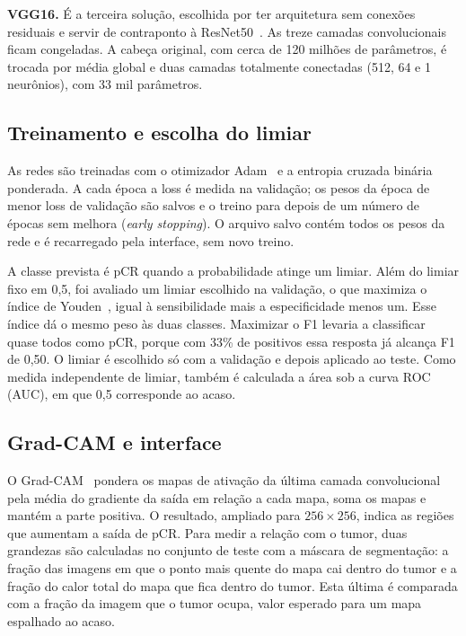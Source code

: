 \documentclass[12pt]{article}
\begin{document}
\textbf{VGG16.} É a terceira solução, escolhida por ter arquitetura sem conexões residuais e servir de
contraponto à ResNet50~\cite{simonyan2015}. As treze camadas convolucionais ficam congeladas. A cabeça
original, com cerca de 120 milhões de parâmetros, é trocada por média global e duas camadas totalmente
conectadas (512, 64 e 1 neurônios), com 33 mil parâmetros.

\subsection{Treinamento e escolha do limiar}

As redes são treinadas com o otimizador Adam~\cite{kingma2015} e a entropia cruzada binária ponderada. A
cada época a loss é medida na validação; os pesos da época de menor loss de validação são salvos e o
treino para depois de um número de épocas sem melhora (\textit{early stopping}). O arquivo salvo contém
todos os pesos da rede e é recarregado pela interface, sem novo treino.

A classe prevista é pCR quando a probabilidade atinge um limiar. Além do limiar fixo em 0,5, foi avaliado
um limiar escolhido na validação, o que maximiza o índice de Youden~\cite{youden1950}, igual à
sensibilidade mais a especificidade menos um. Esse índice dá o mesmo peso às duas classes. Maximizar o F1
levaria a classificar quase todos como pCR, porque com 33\% de positivos essa resposta já alcança F1 de
0,50. O limiar é escolhido só com a validação e depois aplicado ao teste. Como medida independente de
limiar, também é calculada a área sob a curva ROC (AUC), em que 0,5 corresponde ao acaso.

\subsection{Grad-CAM e interface}

O Grad-CAM~\cite{selvaraju2017} pondera os mapas de ativação da última camada convolucional pela média do
gradiente da saída em relação a cada mapa, soma os mapas e mantém a parte positiva. O resultado, ampliado
para $256 \times 256$, indica as regiões que aumentam a saída de pCR. Para medir a relação com o tumor,
duas grandezas são calculadas no conjunto de teste com a máscara de segmentação: a fração das imagens em
que o ponto mais quente do mapa cai dentro do tumor e a fração do calor total do mapa que fica dentro do
tumor. Esta última é comparada com a fração da imagem que o tumor ocupa, valor esperado para um mapa
espalhado ao acaso.
\end{document}
